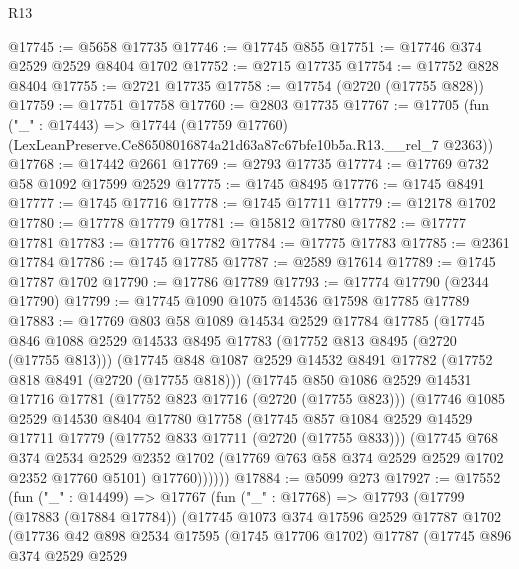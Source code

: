 \begin{lexlean}{R13}
\begin{coremodule}
@17745 := @5658 @17735
@17746 := @17745 @855
@17751 := @17746 @374 @2529 @2529 @8404 @1702
@17752 := @2715 @17735
@17754 := @17752 @828 @8404
@17755 := @2721 @17735
@17758 := @17754 (@2720 (@17755 @828))
@17759 := @17751 @17758
@17760 := @2803 @17735
@17767 := @17705
    (fun ("_" : @17443) =>
    @17744 (@17759 @17760) (LexLeanPreserve.Ce86508016874a21d63a87c67bfe10b5a.R13.__rel_7 @2363))
@17768 := @17442 @2661
@17769 := @2793 @17735
@17774 := @17769 @732 @58 @1092 @17599 @2529
@17775 := @1745 @8495
@17776 := @1745 @8491
@17777 := @1745 @17716
@17778 := @1745 @17711
@17779 := @12178 @1702
@17780 := @17778 @17779
@17781 := @15812 @17780
@17782 := @17777 @17781
@17783 := @17776 @17782
@17784 := @17775 @17783
@17785 := @2361 @17784
@17786 := @1745 @17785
@17787 := @2589 @17614
@17789 := @1745 @17787 @1702
@17790 := @17786 @17789
@17793 := @17774 @17790 (@2344 @17790)
@17799 := @17745 @1090 @1075 @14536 @17598 @17785 @17789
@17883 := @17769
    @803
    @58
    @1089
    @14534
    @2529
    @17784
    @17785
    (@17745
      @846
      @1088
      @2529
      @14533
      @8495
      @17783
      (@17752 @813 @8495 (@2720 (@17755 @813)))
      (@17745
        @848
        @1087
        @2529
        @14532
        @8491
        @17782
        (@17752 @818 @8491 (@2720 (@17755 @818)))
        (@17745
          @850
          @1086
          @2529
          @14531
          @17716
          @17781
          (@17752 @823 @17716 (@2720 (@17755 @823)))
          (@17746
            @1085
            @2529
            @14530
            @8404
            @17780
            @17758
            (@17745
              @857
              @1084
              @2529
              @14529
              @17711
              @17779
              (@17752 @833 @17711 (@2720 (@17755 @833)))
              (@17745
                @768
                @374
                @2534
                @2529
                @2352
                @1702
                (@17769 @763 @58 @374 @2529 @2529 @1702 @2352 @17760 @5101)
                @17760))))))
@17884 := @5099 @273
@17927 := @17552
    (fun ("_" : @14499) =>
    @17767
      (fun ("_" : @17768) =>
      @17793
        (@17799
          (@17883 (@17884 @17784))
          (@17745
            @1073
            @374
            @17596
            @2529
            @17787
            @1702
            (@17736
              @42
              @898
              @2534
              @17595
              (@1745 @17706 @1702)
              @17787
              (@17745
                @896
                @374
                @2529
                @2529

\end{coremodule}
\end{lexlean}
